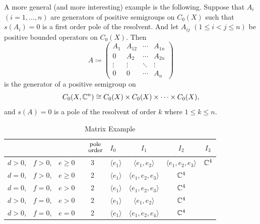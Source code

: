 A more general (and more interesting) example is the following.
Suppose that $A_{i}$ $(i = 1,\ldots,n)$ are generators of positive semigroups on $C_{0}(X)$ such that $s(A_{i}) = 0$ is a first order pole of the resolvent.
And let $A_{ij}$ $(1 \leq i < j \leq n)$ be positive bounded operators on $C_{0}(X)$.
Then
\[
A \coloneq \begin{pmatrix}
	A_{1} & A_{12} & \cdots & A_{1n} \\
	0 & A_{2} & \cdots & A_{2n} \\
	\vdots & \vdots & \ddots & \vdots \\
	0 & 0 & \cdots & A_{n}
\end{pmatrix}
\]
is the generator of a positive semigroup on 
%
\[
	C_{0}(X,\mathbb{C}^{n}) \cong C_{0}(X) \times C_{0}(X) \times \cdots \times C_{0}(X) , 
\]
%
and $s(A) = 0$ is a pole of the resolvent of order $k$ where $1 \leq k \leq n$.
\begin{table}[ht!]
\centering
\caption{Matrix Example}\label{tab:b3-table1}
\begin{tabular}{p{10mm}p{10mm}p{10mm}|c|p{8mm}ccc}
  &&& $\overset{\text{\small pole}}{\text{\small order}}$
      & $I_0$ & $I_1$ & $I_2$ & $I_3$ \\[1ex]\hline
  $d>0$, & $f>0$, & $e\geq 0$ & 3
      & $\langle e_1\rangle$ & $\langle e_1,e_2\rangle$
      & $\langle e_1,e_2,e_3\rangle$ & $\mathbb{C}^4$ \\
  $d=0$, & $f>0$, & $e\geq 0$ & 2
      & $\langle e_1\rangle$ & $\langle e_1,e_2,e_3\rangle$
      & $\mathbb{C}^4$ & \\
  $d=0$, & $f=0$, & $e>0$    & 2
      & $\langle e_1\rangle$ & $\langle e_1,e_2,e_3\rangle$
      & $\mathbb{C}^4$ & \\
  $d>0$, & $f=0$, & $e>0$    & 2
      & $\langle e_1\rangle$ & $\langle e_1,e_2\rangle$
      & $\mathbb{C}^4$ & \\
  $d>0$, & $f=0$, & $e=0$    & 2
      & $\langle e_1\rangle$ & $\langle e_1,e_2,e_4\rangle$
      & $\mathbb{C}^4$ & \\
\end{tabular}
\end{table}
